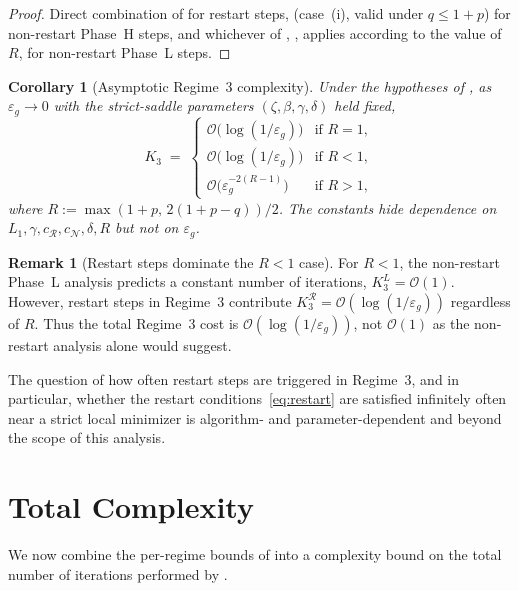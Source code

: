 \documentclass[11pt,a4paper]{article}
\theoremstyle{plain}
\newtheorem{corollary}{Corollary}
\theoremstyle{definition}
\newtheorem{remark}{Remark}
\newcommand{\eps}{\varepsilon}
\newcommand{\epsg}{\eps_{g}}
\newcommand{\Lone}{L_{1}}
\newcommand{\setN}{\mathcal{N}}
\newcommand{\setR}{\mathcal{R}}
\newcommand{\cN}{c_{\setN}}
\begin{document}
\begin{proof}
Direct combination of  for restart steps,  (case~(i), valid under $q \leq 1+p$) for non-restart Phase~H steps, and whichever of , ,  applies according to the value of $R$, for non-restart Phase~L steps.
\end{proof}

\begin{corollary}[Asymptotic Regime~3 complexity]\label{cor:r3-asymptotic}
Under the hypotheses of , as $\epsg \to 0$ with the strict-saddle parameters $(\zeta,\beta,\gamma,\delta)$ held fixed,
\begin{equation}\label{eq:r3-asymptotic}
K_{3} \;=\;
\begin{cases}
\mathcal{O}\bigl(\log(1/\epsg)\bigr) & \text{if } R = 1, \\[2pt]
\mathcal{O}\bigl(\log(1/\epsg)\bigr) & \text{if } R < 1, \\[2pt]
\mathcal{O}\bigl(\epsg^{-2(R-1)}\bigr) & \text{if } R > 1,
\end{cases}
\end{equation}
where $R := \max(1+p,\,2(1+p-q))/2$. The constants hide dependence on $\Lone, \gamma, c_{\setR}, \cN, \delta, R$ but not on $\epsg$.
\end{corollary}

\begin{remark}[Restart steps dominate the $R<1$ case]\label{rem:r3-restart-dominates}
For $R < 1$, the non-restart Phase~L analysis predicts a constant number of iterations, $K_{3}^{L} = \mathcal{O}(1)$. 
However, restart steps in Regime~3 contribute $K_{3}^{\setR} = \mathcal{O}(\log(1/\epsg))$ regardless of $R$. Thus the total Regime~3 cost 
is $\mathcal{O}(\log(1/\epsg))$, not $\mathcal{O}(1)$ as the non-restart analysis alone would suggest.

The question of how often restart steps are triggered in Regime~3, and in particular, whether the restart conditions~\eqref{eq:restart} are satisfied infinitely 
often near a strict local minimizer is algorithm- and parameter-dependent and beyond the scope of this analysis.
\end{remark}

\section{Total Complexity}\label{sec:total}

We now combine the per-regime bounds of  into a complexity bound on the total number of iterations performed by .
\end{document}
